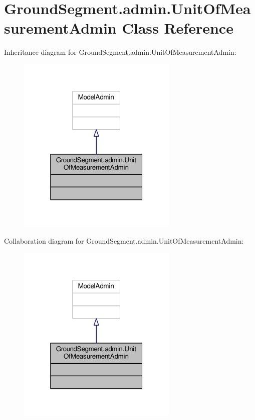 \hypertarget{class_ground_segment_1_1admin_1_1_unit_of_measurement_admin}{}\section{Ground\+Segment.\+admin.\+Unit\+Of\+Measurement\+Admin Class Reference}
\label{class_ground_segment_1_1admin_1_1_unit_of_measurement_admin}


Inheritance diagram for Ground\+Segment.\+admin.\+Unit\+Of\+Measurement\+Admin\+:\nopagebreak
\begin{figure}[H]
\begin{center}
\leavevmode
\includegraphics[width=217pt]{class_ground_segment_1_1admin_1_1_unit_of_measurement_admin__inherit__graph}
\end{center}
\end{figure}


Collaboration diagram for Ground\+Segment.\+admin.\+Unit\+Of\+Measurement\+Admin\+:\nopagebreak
\begin{figure}[H]
\begin{center}
\leavevmode
\includegraphics[width=217pt]{class_ground_segment_1_1admin_1_1_unit_of_measurement_admin__coll__graph}
\end{center}
\end{figure}


